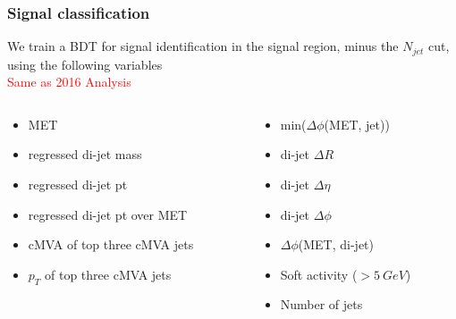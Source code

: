 \documentclass{beamer}
\newcommand{\twofigs}[4]{
  \begin{columns}
    \begin{column}{0.5\linewidth}
      \centering
      \textcolor{blue}{#1} \\
      \texttt{[image: \#2]}
    \end{column}
    \begin{column}{0.5\linewidth}
      \centering
      \textcolor{blue}{#3} \\
      \texttt{[image: \#4]}
    \end{column}
  \end{columns}
}
\begin{document}
%
%
%
%
%
%

\begin{frame}
  \frametitle{Signal classification}
  We train a BDT for signal identification in the signal region, minus the $N_{jet}$ cut,
  using the following variables \\
  \textcolor{red}{Same as 2016 Analysis}

  \begin{columns}
    \begin{column}{0.5\linewidth}
      \begin{itemize}
      \item MET
      \item regressed di-jet mass
      \item regressed di-jet pt
      \item regressed di-jet pt over MET
      \item cMVA of top three cMVA jets
      \item $p_T$ of top three cMVA jets
      \end{itemize}
    \end{column}
    \begin{column}{0.5\linewidth}
      \begin{itemize}
      \item min($\Delta \phi$(MET, jet))
      \item di-jet $\Delta R$
      \item di-jet $\Delta \eta$
      \item di-jet $\Delta \phi$
      \item $\Delta \phi$(MET, di-jet)
      \item Soft activity ($> \SI{5}{GeV}$)
      \item Number of jets
      \end{itemize}
    \end{column}
  \end{columns}
\end{frame}
\end{document}
